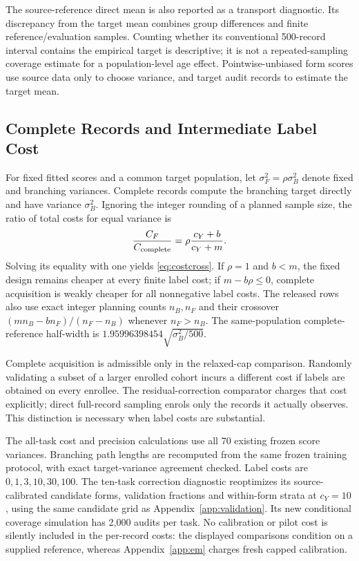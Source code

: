 

The source-reference direct mean is also reported as a transport diagnostic.
Its discrepancy from the target mean combines group differences and
finite reference/evaluation samples. Counting whether its conventional
500-record interval contains the empirical target is descriptive; it is
not a repeated-sampling coverage estimate for a population-level age effect.
Pointwise-unbiased form scores use source data only to choose variance,
and target audit records to estimate the target mean.

\subsection{Complete Records and Intermediate Label Cost}\label{app:cost10}
For fixed fitted scores and a common target population, let
$\sigma_F^2=\rho\sigma_B^2$ denote fixed and branching variances. Complete
records compute the branching target directly and have variance
$\sigma_B^2$. Ignoring the integer rounding of a planned sample size,
the ratio of total costs for equal variance is
\[
 \frac{C_F}{C_{\rm complete}}=\rho\frac{c_Y+b}{c_Y+m}.
\]
Solving its equality with one yields \eqref{eq:costcross}. If $\rho=1$
and $b<m$, the fixed design remains cheaper at every finite label cost;
if $m-b\rho\le0$, complete acquisition is weakly cheaper for all
nonnegative label costs. The released rows also use exact integer planning
counts $n_B,n_F$ and their crossover
$(mn_B-bn_F)/(n_F-n_B)$ whenever $n_F>n_B$.
The same-population complete-reference half-width is
$1.95996398454\sqrt{\sigma_B^2/500}$.

Complete acquisition is admissible only in the relaxed-cap comparison.
Randomly validating a subset of a larger enrolled cohort incurs a different
cost if labels are obtained on every enrollee. The residual-correction
comparator charges that cost explicitly; direct full-record sampling
enrols only the records it actually observes. This distinction is necessary
when label costs are substantial.

The all-task cost and precision calculations use all 70 existing frozen
score variances. Branching path lengths are recomputed from the same
frozen training protocol, with exact target-variance agreement checked.
Label costs are $0,1,3,10,30,100$. The ten-task correction diagnostic
reoptimizes its source-calibrated candidate forms, validation fractions and
within-form strata at $c_Y=10$, using the same candidate grid as
Appendix~\ref{app:validation}. Its new conditional coverage simulation has
2,000 audits per task. No calibration or pilot cost is silently included
in the per-record costs: the displayed comparisons condition on a supplied
reference, whereas Appendix~\ref{app:em} charges fresh capped calibration.

